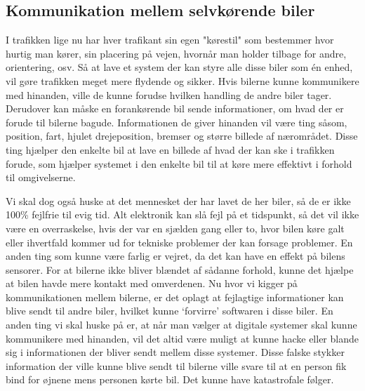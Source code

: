 
\subsection{Kommunikation mellem selvkørende biler}

I trafikken lige nu har hver trafikant sin egen "kørestil" som bestemmer hvor hurtig man kører, sin placering på vejen, hvornår man holder tilbage for andre, orientering, osv.  Så at lave et system der kan styre alle disse biler som \'en enhed, vil gøre trafikken meget mere flydende og sikker. Hvis bilerne kunne kommunikere med hinanden, ville de kunne forudse hvilken handling de andre biler tager. Derudover kan måske en forankørende bil sende informationer, om hvad der er forude til bilerne bagude. Informationen de giver hinanden vil være ting såsom, position, fart, hjulet drejeposition, bremser og større billede af nærområdet. Disse ting hjælper den enkelte bil at lave en billede af hvad der kan ske i trafikken forude, som hjælper systemet i den enkelte bil til at køre mere effektivt i forhold til omgivelserne. 

Vi skal dog også huske at det mennesket der har lavet de her biler, så de er ikke 100\% fejlfrie til evig tid. Alt elektronik kan slå fejl på et tidspunkt, så det vil ikke være en overraskelse, hvis der var en sjælden gang eller to, hvor bilen køre galt eller ihvertfald kommer ud for tekniske problemer der kan forsage problemer. En anden ting som kunne være farlig er vejret, da det kan have en effekt på bilens sensorer. For at bilerne ikke bliver blændet af sådanne forhold, kunne det hjælpe at bilen havde mere kontakt med omverdenen. Nu hvor vi kigger på kommunikationen mellem bilerne, er det oplagt at fejlagtige informationer kan blive sendt til andre biler, hvilket kunne `forvirre' softwaren i disse biler. En anden ting vi skal huske på er, at når man vælger at digitale systemer skal kunne kommunikere med hinanden, vil det altid være muligt at kunne hacke eller blande sig i informationen der bliver sendt mellem disse systemer. Disse falske stykker information der ville kunne blive sendt til bilerne ville svare til at en person fik bind for øjnene mens personen kørte bil. Det kunne have katastrofale følger. 
